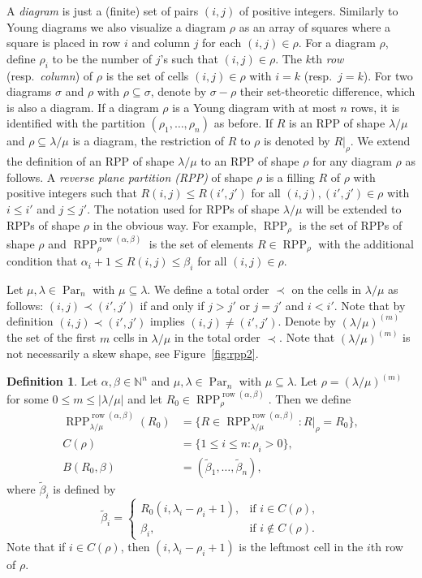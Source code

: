 \documentclass[12pt]{amsart}
\numberwithin{equation}{section}
\theoremstyle{definition}
\newtheorem{defn}[thm]{Definition}
\newcommand\wb{\widetilde{\beta}}
\newcommand\row{\operatorname{row}}
\newcommand\NN{\mathbb{N}}
\newcommand\Par{\operatorname{Par}}
\newcommand\RPP{\operatorname{RPP}}
\newcommand\lm{{\lambda/\mu}}
\begin{document}
A \emph{diagram} is just a (finite) set of pairs $(i,j)$ of positive integers.
Similarly to Young diagrams we also visualize a diagram $\rho$ as an array of
squares where a square is placed in row $i$ and column $j$ for each
$(i,j)\in\rho$. For a diagram $\rho$, define $\rho_i$ to be the number of $j$'s
such that $(i,j)\in\rho$. The $k$th \emph{row} (resp.~\emph{column}) of $\rho$
is the set of cells $(i,j)\in\rho$ with $i=k$ (resp.~\textbf{$j=k$}). For two
diagrams $\sigma$ and $\rho$ with $\rho\subseteq\sigma$, denote by $\sigma-\rho$
their set-theoretic difference, which is also a diagram. If a diagram $\rho$ is
a Young diagram with at most $n$ rows, it is identified with the partition
$(\rho_1,\dots,\rho_n)$ as before. If $R$ is an RPP of shape $\lm$ and
$\rho\subseteq\lm$ is a diagram, the restriction of $R$ to $\rho$ is denoted by
$R|_\rho$. We extend the definition of an RPP of shape $\lm$ to an RPP of shape
$\rho$ for any diagram $\rho$ as follows. A \emph{reverse plane partition (RPP)}
of shape $\rho$ is a filling $R$ of $\rho$ with positive integers such that
$R(i,j)\le R(i',j')$ for all $(i,j),(i',j')\in\rho$ with $i\le i'$ and $j\le
j'$. The notation used for RPPs of shape $\lm$ will be extended to RPPs of shape
$\rho$ in the obvious way. For example, $\RPP_{\rho}$ is the set of RPPs of
shape $\rho$ and $\RPP^{\row(\alpha,\beta)}_{\rho}$ is the set of elements
$R\in\RPP_{\rho}$ with the additional condition that $\alpha_i+1\le R(i,j)\le
\beta_i$ for all $(i,j)\in\rho$.

Let $\mu,\lambda\in\Par_n$ with $\mu\subseteq\lambda$. We define a total order
$\prec$ on the cells in $\lm$ as follows: $(i,j) \prec (i',j')$ if and only if
$j>j'$ or $j=j'$ and $i<i'$. Note that by definition $(i,j) \prec (i',j')$
implies $(i,j)\ne (i',j')$. Denote by $(\lm)^{(m)}$ the set of the first $m$
cells in $\lm$ in the total order $\prec$. Note that $(\lm)^{(m)}$ is not
necessarily a skew shape, see Figure~\ref{fig:rpp2}.


\begin{defn}\label{defn:R0}
  Let $\alpha,\beta\in\NN^n$ and $\mu,\lambda\in\Par_n$ with
  $\mu\subseteq\lambda$. Let $\rho=(\lm)^{(m)}$ for some $0\le m\le|\lm|$ and
  let $R_0\in \RPP^{\row(\alpha,\beta)}_{\rho}$. Then we define
\begin{align*}
  \RPP^{\row(\alpha,\beta)}_{\lm}(R_0)
  &=\{R\in \RPP^{\row(\alpha,\beta)}_{\lm}: R|_\rho = R_0\},\\
 C(\rho)&=\{1\le i\le n: \rho_i>0\},\\
B(R_0,\beta)&=(\wb_1,\dots,\wb_n),
\end{align*}
where $\wb_i$ is defined by
\[
    \wb_i=
\begin{cases}
  R_0(i,\lambda_i-\rho_i+1), & \mbox{if $i\in C(\rho)$},\\
  \beta_i, & \mbox{if $i\notin C(\rho)$}.
\end{cases}
\]
Note that if $i\in C(\rho)$, then $(i,\lambda_i-\rho_i+1)$ is the leftmost cell
in the $i$th row of $\rho$.
\end{defn}
\end{document}
